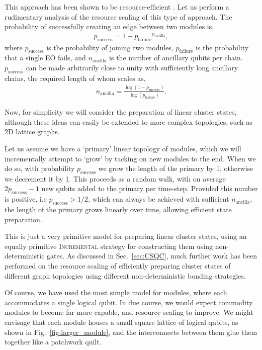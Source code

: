 This approach has been shown to be resource-efficient \cite{bib:YoranReznik03, bib:Nielsen04}. Let us perform a rudimentary analysis of the resource scaling of this type of approach. The probability of successfully creating an edge between two modules is,
\begin{align}
p_\mathrm{success} = 1 - {p_\mathrm{failure}}^{n_\mathrm{ancilla}},
\end{align}
where $p_\mathrm{success}$ is the probability of joining two modules, $p_\mathrm{failure}$ is the probability that a single EO fails, and $n_\mathrm{ancilla}$ is the number of ancillary qubits per chain. $p_\mathrm{success}$ can be made arbitrarily close to unity with sufficiently long ancillary chains, the required length of whom scales as,
\begin{align}
n_\mathrm{ancilla} = \frac{\log (1-p_\mathrm{success})}{\log (p_\mathrm{failure})}.
\end{align}

Now, for simplicity we will consider the preparation of linear cluster states, although these ideas can easily be extended to more complex topologies, such as 2D lattice graphs.

Let us assume we have a `primary' linear topology of modules, which we will incrementally attempt to `grow' by tacking on new modules to the end. When we do so, with probability $p_\mathrm{success}$ we grow the length of the primary by 1, otherwise we decrement it by 1. This proceeds as a random walk, with on average \mbox{$2p_\mathrm{success}-1$} new qubits added to the primary per time-step. Provided this number is positive, i.e \mbox{$p_\mathrm{success}>1/2$}, which can always be achieved with sufficient $n_\mathrm{ancilla}$, the length of the primary grows linearly over time, allowing efficient state preparation.

This is just a very primitive model for preparing linear cluster states, using an equally primitive \textsc{Incremental} strategy for constructing them using non-deterministic gates. As discussed in Sec.~\ref{sec:CSQC}, much further work has been performed on the resource scaling of efficiently preparing cluster states of different graph topologies using different non-deterministic bonding strategies.

Of course, we have used the most simple model for modules, where each accommodates a single logical qubit. In due course, we would expect commodity modules to become far more capable, and resource scaling to improve. We might envisage that each module houses a small square lattice of logical qubits, as shown in Fig.~\ref{fig:larger_module}, and the interconnects between them glue them together like a patchwork quilt.


